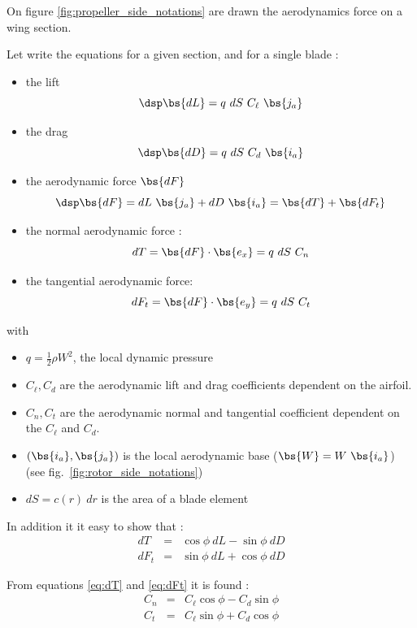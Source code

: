 On figure \ref{fig:propeller_side_notations} are drawn the aerodynamics force on a wing section.

Let write the equations for a given section, and for a single blade :

\begin{itemize}
    \item the lift 
    $$
      \dsp \bs{dL} = q~dS~C_\ell~\bs{j_a}  
    $$
    \item the drag 
    $$
      \dsp \bs{dD} = q~dS~C_d ~\bs{i_a}
    $$
    \item the aerodynamic force $\bs{dF}$
    $$\dsp
    \bs{dF} = dL~\bs{j_a} + dD~\bs{i_a} = \bs{dT} + \bs{dF_t}
    $$
    \item the normal aerodynamic force :
    $$
    dT = \bs{dF}\cdot\bs{e_x} = q~dS~C_n
    $$
    \item the tangential aerodynamic force:
    $$
    dF_t = \bs{dF}\cdot\bs{e_y} = q~dS~C_t
    $$

\end{itemize}

with 
\begin{itemize}
  \item $q=\frac{1}{2} \rho W^2$, the local dynamic pressure
  \item $C_\ell, C_d$ are the aerodynamic lift and drag coefficients dependent on the airfoil.
  \item $C_n, C_t$ are the aerodynamic normal and tangential  coefficient dependent on the $C_{\ell}$ and $C_d$.
  \item $(\bs{i_a}, \bs{j_a})$ is the local aerodynamic base ($\bs{W} = W~\bs{i_a}$) (see fig.~\ref{fig:rotor_side_notations})
  \item $ dS = c(r)~ dr$ is the area of a blade element
\end{itemize}

In addition it it easy to show that :
\begin{eqnarray}
dT &=& \cos\phi ~ dL - \sin\phi~ dD   \label{eq:dT}\\
dF_t &=& \sin\phi ~ dL + \cos\phi~ dD \label{eq:dFt} 
\end{eqnarray}

From equations \ref{eq:dT} and \ref{eq:dFt}  it is found :
\begin{equation}
\begin{array}{lcl}
C_n &=& C_\ell \cos\phi - C_d \sin \phi \\
C_t &=& C_\ell \sin\phi + C_d \cos \phi
\end{array}
\label{eq:CnCt}
\end{equation}



